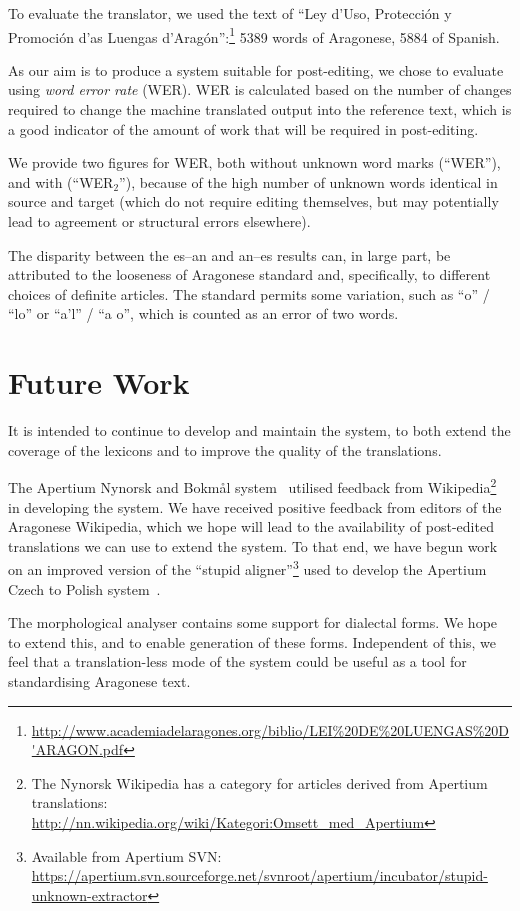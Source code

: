 \documentclass[10pt, a4paper]{article}
\begin{document}
  To evaluate the translator, we used the text of ``Ley d'Uso, Protección y Promoción d'as Luengas d'Aragón'':\footnote{\url{http://www.academiadelaragones.org/biblio/LEI\%20DE\%20LUENGAS\%20D'ARAGON.pdf}} 5389 words of Aragonese, 5884 of Spanish.
  
  As our aim is to produce a system suitable for post-editing, we chose to evaluate using \emph{word error rate} (WER). WER is calculated based on the number of changes required to change the machine translated output into the reference text, which is a good indicator of the amount of work that will be required in post-editing.
  
  We provide two figures for WER, both without unknown word marks (``WER''), and with (``WER$_2$''), because of the high number of unknown words identical in source and target (which do not require editing themselves, but may potentially lead to agreement or structural errors elsewhere).
  
  The disparity between the es--an and an--es results can, in large part, be attributed to the looseness of Aragonese standard and, specifically, to different choices of definite articles. The standard permits some variation, such as ``o'' / ``lo''  or ``a'l'' / ``a o'', which is counted as an error of two words.
  
  \section{Future Work}
  
  It is intended to continue to develop and maintain the system, to both extend the coverage of the lexicons and to improve the quality of the translations.
  
  The Apertium Nynorsk and Bokmål system~\cite{Unhammer} utilised feedback from Wikipedia\footnote{The Nynorsk Wikipedia has a category for articles derived from Apertium translations: {\small \url{http://nn.wikipedia.org/wiki/Kategori:Omsett_med_Apertium}}} in developing the system. We have received positive feedback from editors of the Aragonese Wikipedia, which we hope will lead to the availability of post-edited translations we can use to extend the system. 
To that end, we have begun work on an improved version of the ``stupid aligner''\footnote{Available from Apertium SVN: \url{https://apertium.svn.sourceforge.net/svnroot/apertium/incubator/stupid-unknown-extractor}} used to develop the Apertium Czech to Polish system~\cite{Ruth}.
  
  The morphological analyser contains some support for dialectal forms. We hope to extend this, and to enable generation of these forms. Independent of this, we feel that a translation-less mode of the system could be useful as a tool for standardising Aragonese text.
  
\end{document}
